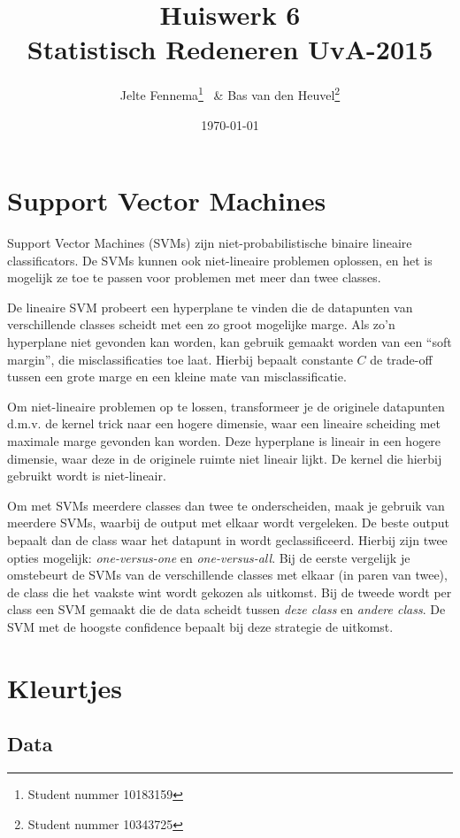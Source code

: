 \documentclass{article}
\title{Huiswerk 6\\ \large{Statistisch Redeneren UvA-2015}}
\author{Jelte Fennema\thanks{Student nummer 10183159} ~\& Bas van den
Heuvel\thanks{Student nummer 10343725}}
\date{\today}
\begin{document}
\maketitle

\section{Support Vector Machines}
Support Vector Machines (SVMs) zijn niet-probabilistische binaire lineaire
classificators. De SVMs kunnen ook niet-lineaire problemen oplossen, en het is
mogelijk ze toe te passen voor problemen met meer dan twee classes.

De lineaire SVM probeert een hyperplane te vinden die de datapunten van
verschillende classes scheidt met een zo groot mogelijke marge. Als zo'n
hyperplane niet gevonden kan worden, kan gebruik gemaakt worden van een ``soft
margin'', die misclassificaties toe laat. Hierbij bepaalt constante $C$ de
trade-off tussen een grote marge en een kleine mate van misclassificatie.

Om niet-lineaire problemen op te lossen, transformeer je de originele datapunten
d.m.v. de kernel trick naar een hogere dimensie, waar een lineaire scheiding met
maximale marge gevonden kan worden. Deze hyperplane is lineair in een hogere
dimensie, waar deze in de originele ruimte niet lineair lijkt. De kernel die
hierbij gebruikt wordt is niet-lineair.

Om met SVMs meerdere classes dan twee te onderscheiden, maak je gebruik van
meerdere SVMs, waarbij de output met elkaar wordt vergeleken. De beste output
bepaalt dan de class waar het datapunt in wordt geclassificeerd. Hierbij zijn
twee opties mogelijk: \textit{one-versus-one} en \textit{one-versus-all}. Bij de
eerste vergelijk je omstebeurt de SVMs van de verschillende classes met elkaar
(in paren van twee), de class die het vaakste wint wordt gekozen als uitkomst.
Bij de tweede wordt per class een SVM gemaakt die de data scheidt tussen
\textit{deze class} en \textit{andere class}. De SVM met de hoogste confidence
bepaalt bij deze strategie de uitkomst.

\section{Kleurtjes}

\subsection{Data}
\end{document}
